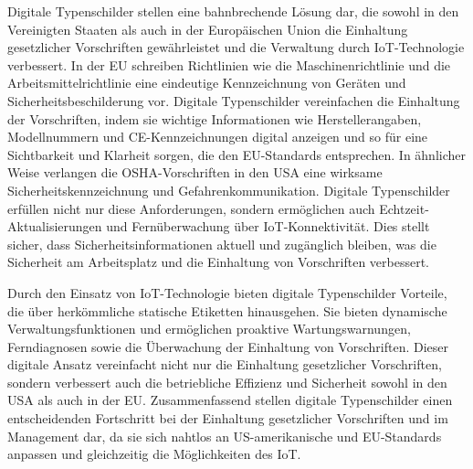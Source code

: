 	Digitale Typenschilder stellen eine bahnbrechende Lösung dar, die sowohl in den Vereinigten Staaten als auch in der Europäischen Union die Einhaltung gesetzlicher Vorschriften gewährleistet und die Verwaltung durch IoT-Technologie verbessert.
	In der EU schreiben Richtlinien wie die Maschinenrichtlinie und die Arbeitsmittelrichtlinie eine eindeutige Kennzeichnung von Geräten und Sicherheitsbeschilderung vor. Digitale Typenschilder vereinfachen die Einhaltung der Vorschriften, indem sie wichtige Informationen wie Herstellerangaben, Modellnummern und CE-Kennzeichnungen digital anzeigen und so für eine Sichtbarkeit und Klarheit sorgen, die den EU-Standards entsprechen.
	In ähnlicher Weise verlangen die OSHA-Vorschriften in den USA eine wirksame Sicherheitskennzeichnung und Gefahrenkommunikation. 
	Digitale Typenschilder erfüllen nicht nur diese Anforderungen, sondern ermöglichen auch Echtzeit-Aktualisierungen und Fernüberwachung über IoT-Konnektivität. Dies stellt sicher, dass Sicherheitsinformationen aktuell und zugänglich bleiben, was die Sicherheit am Arbeitsplatz und die Einhaltung von Vorschriften verbessert.

	Durch den Einsatz von IoT-Technologie bieten digitale Typenschilder Vorteile, die über herkömmliche statische Etiketten hinausgehen. Sie bieten dynamische Verwaltungsfunktionen und ermöglichen proaktive Wartungswarnungen, Ferndiagnosen sowie die Überwachung der Einhaltung von Vorschriften. Dieser digitale Ansatz vereinfacht nicht nur die Einhaltung gesetzlicher Vorschriften, sondern verbessert auch die betriebliche Effizienz und Sicherheit sowohl in den USA als auch in der EU.
	Zusammenfassend stellen digitale Typenschilder einen entscheidenden Fortschritt bei der Einhaltung gesetzlicher Vorschriften und im Management dar, da sie sich nahtlos an US-amerikanische und EU-Standards anpassen und gleichzeitig die Möglichkeiten des IoT. \cite{yoke:2025}

